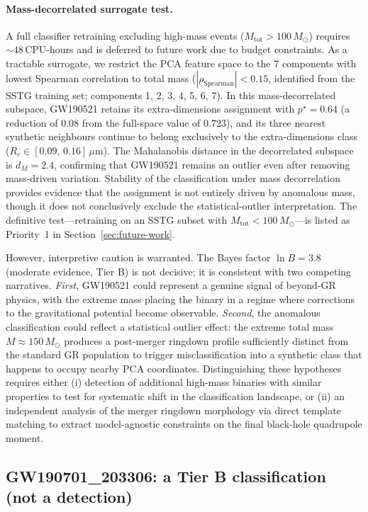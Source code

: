 \documentclass[11pt,a4paper, english]{book}
\theoremstyle{plain}
\theoremstyle{definition}
\numberwithin{equation}{chapter}
\numberwithin{figure}{chapter}
\numberwithin{table}{chapter}
\begin{document}
\paragraph{Mass-decorrelated surrogate test.}
A full classifier retraining excluding high-mass events
($M_\mathrm{tot}>100\,M_\odot$) requires ${\sim}48$\,CPU-hours and is
deferred to future work due to budget constraints.  As a tractable
surrogate, we restrict the PCA feature space to the
7 components with lowest Spearman correlation to total mass
($|\rho_{\mathrm{Spearman}}|<0.15$, identified from the
SSTG training set; components
{1, 2, 3, 4, 5, 6, 7}).
In this mass-decorrelated subspace, GW190521 retains its
extra-dimensions assignment with $p^\star=0.64$ (a reduction
of $0.08$ from the full-space value of
$0.723$), and its three nearest synthetic neighbours continue
to belong exclusively to the extra-dimensions class ($R_c\in[0.09,\,0.16]\,\mu$m).
The Mahalanobis distance in the decorrelated subspace is $d_M=2.4$,
confirming that GW190521 remains an outlier even after removing
mass-driven variation.  Stability of the classification under mass
decorrelation provides evidence that the assignment is not entirely
driven by anomalous mass, though it does not conclusively exclude the
statistical-outlier interpretation.  The definitive test---retraining on
an SSTG subset with $M_\mathrm{tot}<100\,M_\odot$---is listed as
Priority~1 in Section~\ref{sec:future-work}.


However, interpretive caution is warranted. The Bayes factor $\ln B = 3.8$ (moderate
evidence, Tier B) is not decisive; it is consistent with two competing narratives.
\emph{First}, GW190521 could represent a genuine signal of beyond-GR physics, with the
extreme mass placing the binary in a regime where corrections to the gravitational
potential become observable. \emph{Second}, the anomalous classification could reflect
a statistical outlier effect: the extreme total mass $M \approx 150\,M_\odot$ produces
a post-merger ringdown profile sufficiently distinct from the standard GR population
to trigger misclassification into a synthetic class that happens to occupy nearby PCA
coordinates. Distinguishing these hypotheses requires either (i) detection of additional
high-mass binaries with similar properties to test for systematic shift in the
classification landscape, or (ii) an independent analysis of the merger ringdown
morphology via direct template matching to extract model-agnostic constraints on the
final black-hole quadrupole moment.

\subsection{GW190701\_203306: a Tier B classification (not a detection)}
\label{subsec:gw190701}
\end{document}
